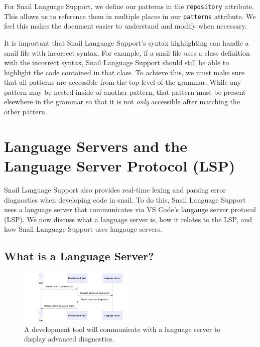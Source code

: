\documentclass{article}
\begin{document}
For Snail Language Support, we define our patterns in the \lstinline{repository} attribute. This allows us to reference them in multiple places in our \lstinline{patterns} attribute. We feel this makes the document easier to understand and modify when necessary. 

It is important that Snail Language Support's syntax highlighting can handle a snail file with incorrect syntax. For example, if a snail file uses a class definition with the incorrect syntax, Snail Language Support should still be able to highlight the code contained in that class. To achieve this, we must make sure that all patterns are accessible from the top level of the grammar. While any pattern may be nested inside of another pattern, that pattern must be present elsewhere in the grammar so that it is not \emph{only} accessible after matching the other pattern.

\section{Language Servers and the Language Server Protocol (LSP)}

Snail Language Support also provides real-time lexing and parsing error diagnostics when developing code in snail. To do this, Snail Language Support uses a language server that communicates via VS Code's langauge server protocol (LSP). We now discuss what a language server is, how it relates to the LSP, and how Snail Language Support uses langauge servers. 

\subsection{What is a Language Server?}

\begin{figure}
    \begin{center}
        \includegraphics[width=0.5\textwidth]{png/language-server.png}
        \caption{
            \centering 
            A development tool will communicate with a language server to display advanced diagnostics.
        }
        \label{fig:language-server}
    \end{center}
\end{figure}
\end{document}
